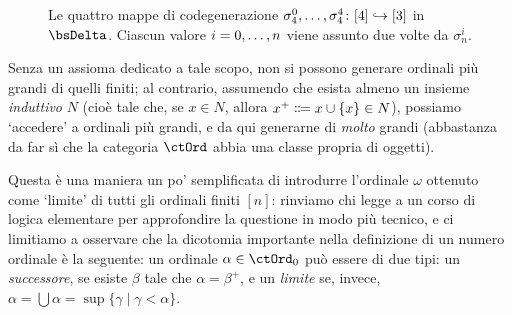 \begin{figure}
\begin{center}
 \end{center}
 \caption{Le quattro mappe di codegenerazione \(\sigma_4^0,\dots,\sigma_4^4 \colon [4]\hookrightarrow [3]\) in \(\bsDelta\). Ciascun valore \(i=\iter[0] n\) viene assunto due volte da \(\sigma_n^i\).}
 \label{fig:cofa}
\end{figure}
\begin{remark}\label{tipi_di_ordinaly}
 Senza un assioma dedicato a tale scopo, non si possono generare ordinali più grandi di quelli finiti; al contrario, assumendo che esista almeno un insieme \emph{induttivo} \(N\) (cioè tale che, se \(x\in N\), allora \(x^+\defeq x\cup\{x\}\in N\)), possiamo `accedere' a ordinali più grandi, e da qui generarne di \emph{molto} grandi (abbastanza da far sì che la categoria \(\ctOrd\) abbia una classe propria di oggetti).

 Questa è una maniera un po' semplificata di introdurre l'ordinale \(\omega\) ottenuto come `limite' di tutti gli ordinali finiti \([n]\): rinviamo chi legge a un corso di logica elementare per approfondire la questione in modo più tecnico, e ci limitiamo a osservare che la dicotomia importante nella definizione di un numero ordinale è la seguente: un ordinale \(\alpha\in\ctOrd_0\) può essere di due tipi: un \emph{successore}, se esiste \(\beta\) tale che \(\alpha=\beta^+\), e un \emph{limite} se, invece, \(\alpha=\bigcup\alpha=\sup\{\gamma\mid \gamma < \alpha\}\).
\end{remark}
